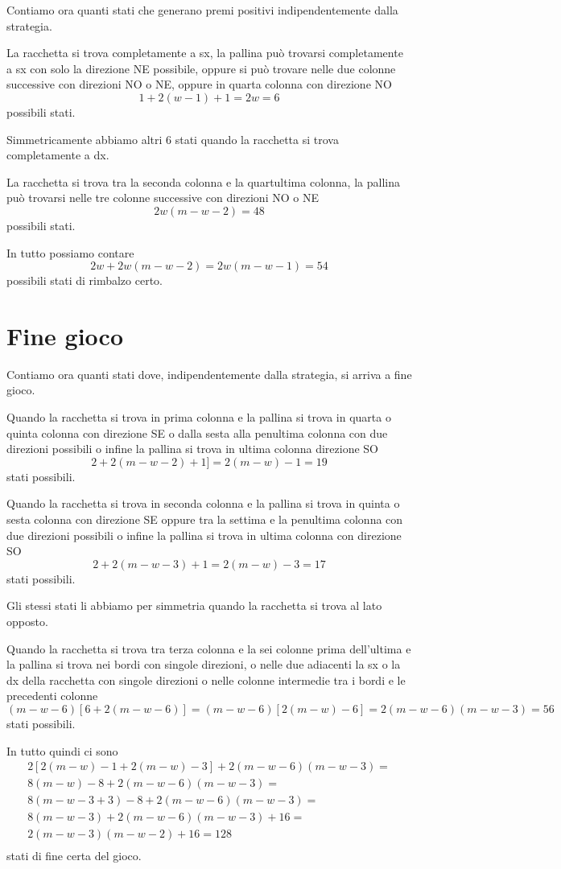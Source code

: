 \documentclass[a4paper,11pt]{article}
\begin{document}
Contiamo ora quanti stati che generano premi positivi indipendentemente dalla strategia.

La racchetta si trova completamente a sx, la pallina può trovarsi completamente a sx con solo la direzione NE possibile, oppure si può trovare nelle due colonne successive con direzioni NO o NE, oppure in quarta colonna con direzione NO
\[ 1 + 2(w-1) + 1 = 2w =  6 \]
possibili stati.

Simmetricamente abbiamo altri 6 stati quando la racchetta si trova completamente a dx.

La racchetta si trova tra la seconda colonna e la quartultima colonna, la pallina può trovarsi nelle tre colonne successive con direzioni NO o NE
\[
2w(m-w-2) = 48
\]
possibili stati.

In tutto possiamo contare 
\[
2w+2w(m-w-2) = 2w(m-w-1)=54
\]
possibili stati di rimbalzo certo.


\section{Fine gioco}

Contiamo ora quanti stati dove, indipendentemente dalla strategia, si arriva a fine gioco.

Quando la racchetta si trova in prima colonna e la pallina si trova in quarta o quinta colonna con direzione SE o dalla sesta alla penultima colonna con due direzioni possibili o infine la pallina si trova in ultima colonna direzione SO
\[
2+2(m-w-2)+1]=2(m-w)-1=19
\]
stati possibili.

Quando la racchetta si trova in seconda colonna e la pallina si trova in quinta o sesta colonna con direzione SE oppure tra la settima e la penultima colonna con due direzioni possibili o infine la pallina si trova in ultima colonna con direzione SO
\[
2+2(m-w-3)+1 = 2(m-w)-3 = 17
\]
stati possibili.

Gli stessi stati li abbiamo per simmetria quando la racchetta si trova al lato opposto.

Quando la racchetta si trova tra terza colonna e la sei colonne prima dell'ultima e la pallina si trova nei bordi con singole direzioni, o nelle due adiacenti la sx o la dx della racchetta con singole direzioni o nelle colonne intermedie tra i bordi e le precedenti colonne
\[
(m-w-6)[6 + 2(m-w-6)]=
(m-w-6)[2(m-w)-6]=
2(m-w-6)(m-w-3)=56
\]
stati possibili.

In tutto quindi ci sono
\[
\begin{array}{c}
 2[2(m-w)-1+2(m-w)-3]+2(m-w-6)(m-w-3)= \\
 8(m-w)-8+2(m-w-6)(m-w-3)= \\
 8(m-w-3+3)-8+2(m-w-6)(m-w-3)= \\
 8(m-w-3)+2(m-w-6)(m-w-3)+16= \\
 2(m-w-3)(m-w-2)+16=128 \\
\end{array}
\] stati di fine certa del gioco.
\end{document}
